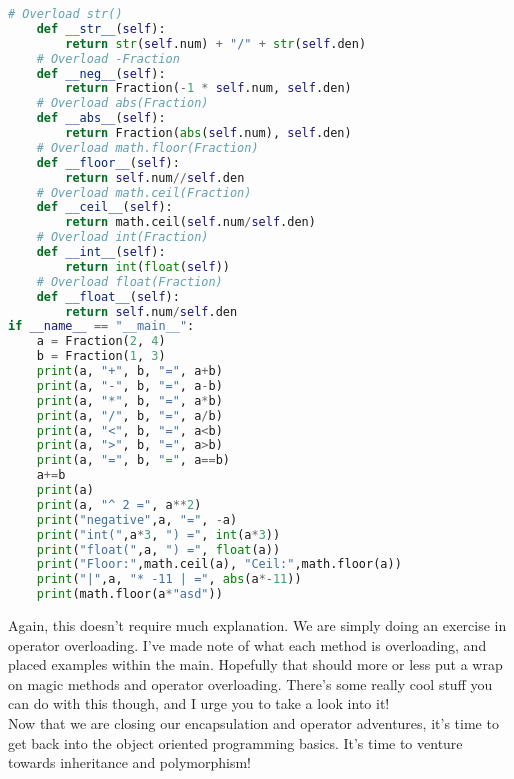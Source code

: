 \documentclass[12pt]{article}
\begin{document}
\begin{lstlisting}[language=Python]
    # Overload str()
    def __str__(self):
        return str(self.num) + "/" + str(self.den)
    # Overload -Fraction
    def __neg__(self):
        return Fraction(-1 * self.num, self.den)
    # Overload abs(Fraction)
    def __abs__(self):
        return Fraction(abs(self.num), self.den)
    # Overload math.floor(Fraction)
    def __floor__(self):
        return self.num//self.den
    # Overload math.ceil(Fraction)
    def __ceil__(self):
        return math.ceil(self.num/self.den)
    # Overload int(Fraction)
    def __int__(self):
        return int(float(self))
    # Overload float(Fraction)
    def __float__(self):
        return self.num/self.den
if __name__ == "__main__":
    a = Fraction(2, 4)
    b = Fraction(1, 3)
    print(a, "+", b, "=", a+b)
    print(a, "-", b, "=", a-b)
    print(a, "*", b, "=", a*b)
    print(a, "/", b, "=", a/b)
    print(a, "<", b, "=", a<b)
    print(a, ">", b, "=", a>b)
    print(a, "=", b, "=", a==b)
    a+=b
    print(a)
    print(a, "^ 2 =", a**2)
    print("negative",a, "=", -a)
    print("int(",a*3, ") =", int(a*3))
    print("float(",a, ") =", float(a))
    print("Floor:",math.ceil(a), "Ceil:",math.floor(a))
    print("|",a, "* -11 | =", abs(a*-11))
    print(math.floor(a*"asd"))
\end{lstlisting}
Again, this doesn't require much explanation. We are simply doing an exercise in operator overloading. I've made note of what each method is overloading, and placed examples within the main. Hopefully that should more or less put a wrap on magic methods and operator overloading. There's some really cool stuff you can do with this though, and I urge you to take a look into it!\\
Now that we are closing our encapsulation and operator adventures, it's time to get back into the object oriented programming basics. It's time to venture towards inheritance and polymorphism!\\

\\
\end{document}
